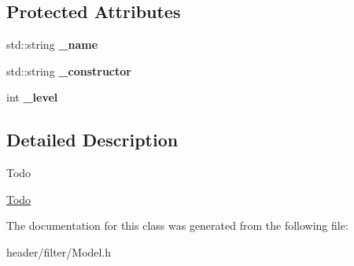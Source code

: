 \subsection*{Protected Attributes}
\begin{DoxyCompactItemize}
\item 
\mbox{\label{classfilter_1_1_model_a41df617b979e043f91d365a7778c93b6}} 
std\+::string {\bfseries \+\_\+name}
\item 
\mbox{\label{classfilter_1_1_model_a3ef5457558b7f89a93ffc87db0e236a6}} 
std\+::string {\bfseries \+\_\+constructor}
\item 
\mbox{\label{classfilter_1_1_model_ae757522e50cc86b0d476f6c4a6d9cbf6}} 
int {\bfseries \+\_\+level}
\end{DoxyCompactItemize}


\subsection{Detailed Description}
\begin{DoxyRefDesc}{Todo}
\item[\hyperlink{todo__todo000028}{Todo}]\end{DoxyRefDesc}


The documentation for this class was generated from the following file\+:\begin{DoxyCompactItemize}
\item 
header/filter/Model.\+h\end{DoxyCompactItemize}
